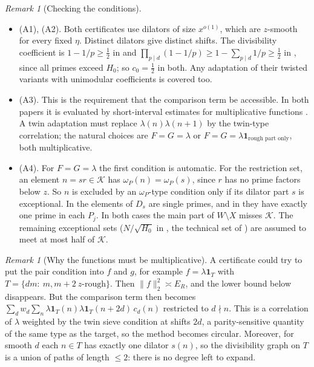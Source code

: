 \documentclass[11pt]{amsart}
\theoremstyle{definition}
\theoremstyle{remark}
\newtheorem{remark}[theorem]{Remark}
\begin{document}
\begin{remark}[Checking the conditions]\label{rem:check}
\leavevmode
\begin{itemize}
\item (A1), (A2). Both certificates use dilators of size $x^{o(1)}$, which are $z$-smooth for every fixed $\eta$. Distinct dilators give distinct shifts. The divisibility coefficient is $1-1/p\ge\frac12$ in \cite{HR21} and $\prod_{p\mid d}(1-1/p)\ge1-\sum_{p\mid d}1/p\ge\frac12$ in \cite{Pil23}, since all primes exceed $H_0$; so $c_0=\frac12$ in both. Any adaptation of their twisted variants with unimodular coefficients is covered too.
\item (A3). This is the requirement that the comparison term be accessible. In both papers it is evaluated by short-interval estimates for multiplicative functions \cite{MR16,MRT15}. A twin adaptation must replace $\lambda(n)\lambda(n+1)$ by the twin-type correlation; the natural choices are $F=G=\lambda$ or $F=G=\lambda\mathbf 1_{\text{rough part only}}$, both multiplicative.
\item (A4). For $F=G=\lambda$ the first condition is automatic. For the restriction set, an element $n=sr\in\mathcal K$ has $\omega_P(n)=\omega_P(s)$, since $r$ has no prime factors below $z$. So $n$ is excluded by an $\omega_P$-type condition only if its dilator part $s$ is exceptional. In \cite{HR21} the elements of $D_s$ are single primes, and in \cite{Pil23} they have exactly one prime in each $P_j$. In both cases the main part of $W\setminus X$ misses $\mathcal K$. The remaining exceptional sets ($N/\sqrt{H_0}$ in \cite{HR21}, the technical set of \cite[Def.~7.4]{Pil23}) are assumed to meet at most half of $\mathcal K$.
\end{itemize}
\end{remark}

\begin{remark}[Why the functions must be multiplicative]
A certificate could try to put the pair condition into $f$ and $g$, for example $f=\lambda\mathbf 1_{T}$ with $T=\{dm:\ m,m+2\ z\text{-rough}\}$. Then $\|f\|_2^2\asymp E_R$, and the lower bound below disappears. But the comparison term then becomes $\sum_dw_d\sum_n\lambda\mathbf 1_T(n)\lambda\mathbf 1_T(n+2d)\,c_d(n)$ restricted to $d\nmid n$. This is a correlation of $\lambda$ weighted by the twin sieve condition at shifts $2d$, a parity-sensitive quantity of the same type as the target, so the method becomes circular. Moreover, for smooth $d$ each $n\in T$ has exactly one dilator $s(n)$, so the divisibility graph on $T$ is a union of paths of length $\le2$: there is no degree left to expand.
\end{remark}
\end{document}
